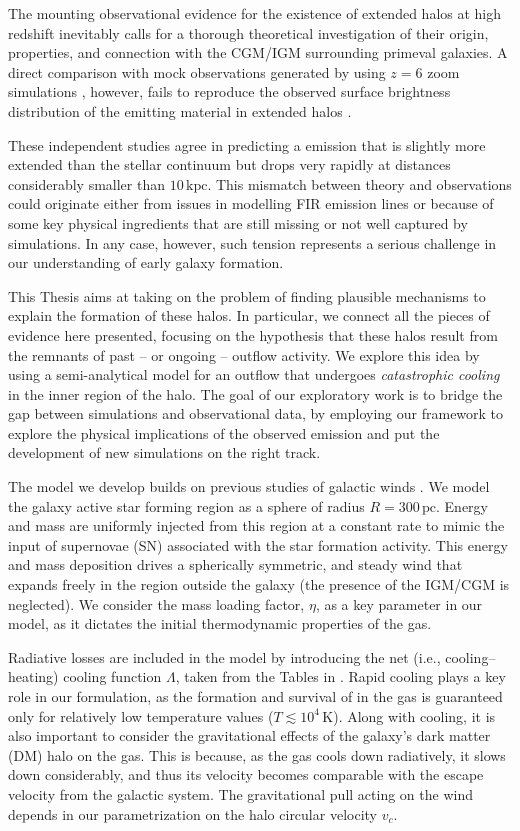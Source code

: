 \documentclass[a4paper, 12pt]{article}
\begin{document}
The mounting observational evidence for the existence of extended \CII halos at high redshift inevitably calls for a thorough theoretical investigation of their origin, properties, and connection with the CGM/IGM surrounding primeval galaxies. A direct comparison with mock observations generated by using $z=6$ zoom simulations \citep{pallottini2017b, Arata:2019}, however, fails to reproduce the observed \CII surface brightness distribution of the emitting material in extended halos \citep{Fujimoto19}.

These independent studies agree in predicting a \CII emission that is slightly more extended than the stellar continuum but drops very rapidly at distances considerably smaller than $10\,\mathrm{kpc}$. This mismatch between theory and observations could originate either from issues in modelling FIR emission lines or because of some key physical ingredients that are still missing or not well captured by simulations. In any case, however, such tension represents a serious challenge in our understanding of early galaxy formation. 

This Thesis aims at taking on the problem of finding plausible mechanisms to explain the formation of these halos. In particular, we connect all the pieces of evidence here presented, focusing on the hypothesis that these halos result from the remnants of past -- or ongoing -- outflow activity. We explore this idea by using a semi-analytical model for an outflow that undergoes \textit{catastrophic cooling} in the inner region of the halo. The goal of our exploratory work is to bridge the gap between simulations and observational data, by employing our framework to explore the physical implications of the observed emission and put the development of new simulations on the right track.

The model we develop builds on previous studies of galactic winds \cite{chevalier_clegg:1985, Thompson16}. We model the galaxy active star forming region as a sphere of radius $R=300\,\mathrm{pc}$. Energy and mass are uniformly injected from this region at a constant rate to mimic the input of supernovae (SN) associated with the star formation activity. This energy and mass deposition drives a spherically symmetric, and steady wind that expands freely in the region outside the galaxy (the presence of the IGM/CGM is neglected). We consider the mass loading factor, $\eta$, as a key parameter in our model, as it dictates the initial thermodynamic properties of the gas.

Radiative losses are included in the model by introducing the net (i.e., cooling--heating) cooling function $\Lambda$, taken from the Tables in \citet{gnedin2012cooling}. Rapid cooling plays a key role in our formulation, as the formation and survival of \CII in the gas is guaranteed only for relatively low temperature values ($T\lesssim 10^4\,\mathrm{K}$). Along with cooling, it is also important to consider the gravitational effects of the galaxy's dark matter (DM) halo on the gas. This is because, as the gas cools down radiatively, it slows down considerably, and thus its velocity becomes comparable with the escape velocity from the galactic system. The gravitational pull acting on the wind depends in our parametrization on the halo circular velocity $v_c$. 
\end{document}
